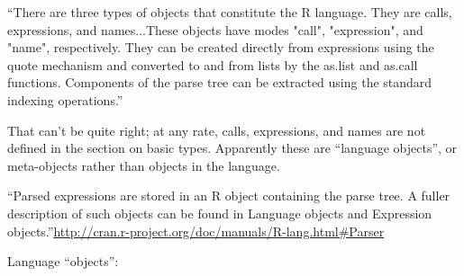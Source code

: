 ``There are three types of objects that constitute the R
language. They are calls, expressions, and
names...These objects have modes "call", "expression", and "name",
respectively.  They can be created directly from expressions using the
quote mechanism and converted to and from lists by the as.list and
as.call functions. Components of the parse tree can be extracted using
the standard indexing operations.''

That can't be quite right; at any rate, calls, expressions, and names
are not defined in the section on basic types.  Apparently these are
``language objects'', or meta-objects rather than objects in the language.

``Parsed expressions are stored in an R object containing the parse
tree. A fuller description of such objects can be found in Language
objects and Expression
objects.''\url{http://cran.r-project.org/doc/manuals/R-lang.html#Parser}


\medskip
\noindent Language ``objects'':

